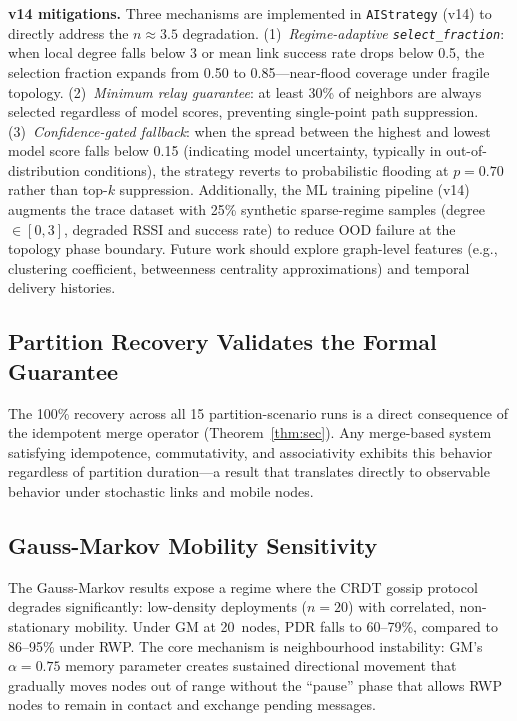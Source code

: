 \documentclass[conference]{IEEEtran}
\begin{document}
\textbf{v14 mitigations.}
Three mechanisms are implemented in \texttt{AIStrategy} (v14) to directly
address the $n{\approx}3.5$ degradation.  (1)~\emph{Regime-adaptive
\texttt{select\_fraction}}: when local degree falls below 3 or mean link
success rate drops below 0.5, the selection fraction expands from 0.50 to
0.85---near-flood coverage under fragile topology.  (2)~\emph{Minimum relay
guarantee}: at least 30\% of neighbors are always selected regardless of
model scores, preventing single-point path suppression.  (3)~\emph{Confidence-gated
fallback}: when the spread between the highest and lowest model score falls
below 0.15 (indicating model uncertainty, typically in out-of-distribution
conditions), the strategy reverts to probabilistic flooding at $p{=}0.70$
rather than top-$k$ suppression.  Additionally, the ML training pipeline
(v14) augments the trace dataset with 25\% synthetic sparse-regime samples
(degree~$\in[0,3]$, degraded RSSI and success rate) to reduce OOD failure
at the topology phase boundary.  Future work should explore
graph-level features (e.g., clustering coefficient, betweenness centrality
approximations) and temporal delivery histories.

\subsection{Partition Recovery Validates the Formal Guarantee}
The 100\% recovery across all 15 partition-scenario runs is a direct consequence of the idempotent
merge operator (Theorem~\ref{thm:sec}).  Any merge-based system satisfying
idempotence, commutativity, and associativity exhibits this behavior regardless
of partition duration---a result that translates directly to observable behavior
under stochastic links and mobile nodes.


\subsection{Gauss-Markov Mobility Sensitivity}
\label{ssec:gm_discuss}

The Gauss-Markov results expose a regime where the CRDT gossip protocol
degrades significantly: low-density deployments ($n=20$) with correlated,
non-stationary mobility.  Under GM at 20~nodes, PDR falls to 60--79\%,
compared to 86--95\% under RWP.  The core mechanism is neighbourhood instability:
GM's $\alpha=0.75$ memory parameter creates sustained directional movement that
gradually moves nodes out of range without the ``pause'' phase that allows RWP
nodes to remain in contact and exchange pending messages.
\end{document}
